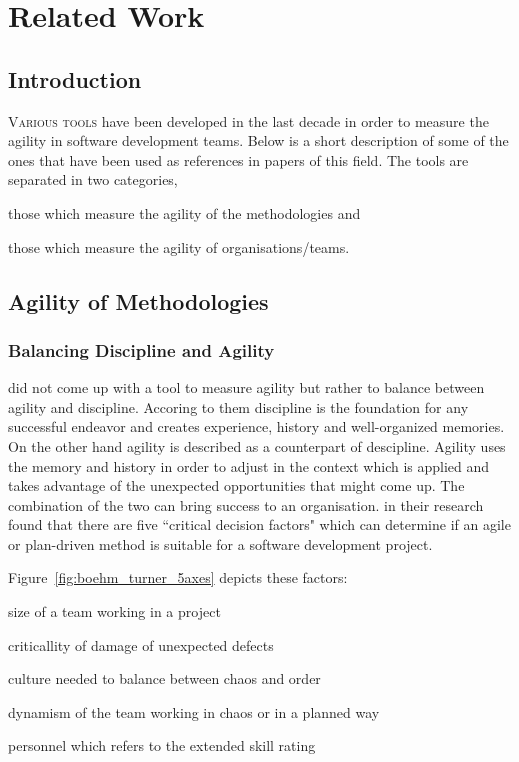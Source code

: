 \chapter{Related Work}\label{ch:related_work}

\section{Introduction}
\lettrine[lines=4, loversize=-0.1, lraise=0.1]{V}{arious tools} have been developed in the last decade in order to measure the agility in software development teams. Below is a short description of some of the ones that have been used as references in papers of this field. The tools are separated in two categories, 
\begin{inparaenum} [a\upshape)]
\item those which measure the agility of the methodologies and
\item those which measure the agility of organisations/teams.
\end{inparaenum}

\section{Agility of Methodologies}

\subsection{Balancing Discipline and Agility}
\citet{1231450} did not come up with a tool to measure agility but rather to balance between agility and discipline. Accoring to them \cite{1317503} discipline is the foundation for any successful endeavor and creates experience, history and well-organized memories. On the other hand agility is described as a counterpart of descipline. Agility uses the memory and history in order to adjust in the context which is applied and takes advantage of the unexpected opportunities that might come up. The combination of the two can bring success to an organisation. 
\citet{1231450} in their research found that there are five ``critical decision factors" which can determine if an agile or plan-driven method is suitable for a software development project.

Figure~\ref{fig:boehm_turner_5axes} depicts these factors:
\begin{inparaenum} [a\upshape)]
\item size of a team working in a project
\item criticallity of damage of unexpected defects
\item culture needed to balance between chaos and order
\item dynamism of the team working in chaos or in a planned way
\item personnel which refers to the extended \citet{cockburn2002agile} skill rating %
\end{inparaenum}

